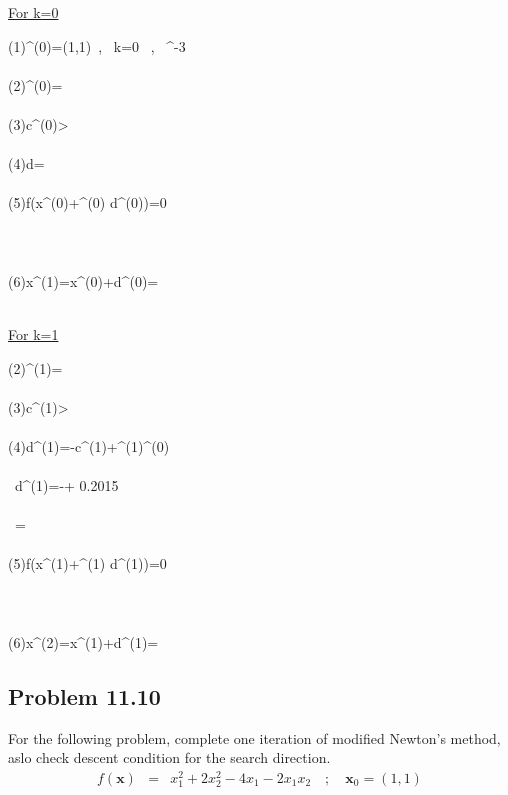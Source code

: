 \documentclass[]{report}
\begin{document}
\underline{For k=0}
\begin{program}
\left(1\right)\quad {}^{(0)}=\left(1,1\right)\ , \, k=0 \ , \ ^{-3}\\~ \\
\left(2\right)\quad {}^{(0)}=\left[22.4599 \ , \ 42.008\right]\\~  \\
\left(3\right)\quad \lvert \mathbf c^{(0)}>\epsilon\\~  \\
\left(4\right)\quad \mathbf d=\left[-22.4599 \ , \ -42.008\right]\\~  \\
\left(5\right)\quad \delta f\left(\mathbf x^{(0)}+\alpha^{(0)} \mathbf d^{(0)}\right)=0\\~\\
\quad \quad \quad {}\\~\\
\left(6\right)\quad \mathbf x^{(1)}=\mathbf x^{(0)}+\mathbf d^{(0)}=\left[0.4215\ , \ -0.0819\right]
\end{program}
~\\
\underline{For k=1}
\begin{program}
\left(2\right)\quad {}^{(1)}=\left[8.465 \ , \ -4.5259\right]\\~  \\
\left(3\right)\quad \lvert \mathbf c^{(1)}>\epsilon\\~  \\
\left(4\right)\quad \mathbf d^{(1)}=-\mathbf c^{(1)}+\beta^{(1)}^{(0)}\\~  \\
\quad \quad \ \mathbf d^{(1)}=-\left[8.465 \ , \ -4.5259\right]+ 0.2015 \left[-22.4599 \ , \ 42.008\right]\\~  \\
\quad \quad \quad \  \quad=\left[-12.9909 \ , \ 12.9909 \right] \\~  \\
\left(5\right)\quad \delta f\left(\mathbf x^{(1)}+\alpha^{(1)} \mathbf d^{(1)}\right)=0\\~\\
\quad \quad \quad {}\\~\\
\left(6\right)\quad \mathbf x^{(2)}=\mathbf x^{(1)}+\mathbf d^{(1)}=\left[0.2294\ , \ 0.1133\right]
\end{program}
\subsection*{Problem 11.10}
For the following problem, complete one iteration of modified Newton's method, aslo check descent condition for the search direction.
\begin{eqnarray*}
f\left(\mathbf x\right)&=&x_1^2+2x_2^2-4x_1-2x_1x_2 \quad ; \quad \mathbf{x}_0=\left(1,1\right)
\end{eqnarray*}
\end{document}

